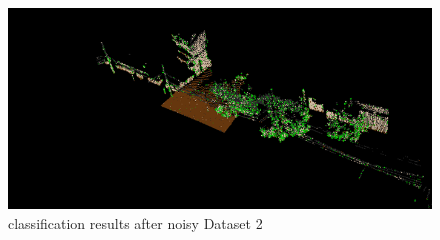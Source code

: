 \documentclass[letterpaper]{article}
\begin{document}
\begin{figure}[h]
  \centering
\includegraphics[scale = 0.4]{addnoiseto2}
\caption{classification results after noisy Dataset 2}
\label{fig:addnoiseto2}
\end{figure}
\end{document}
